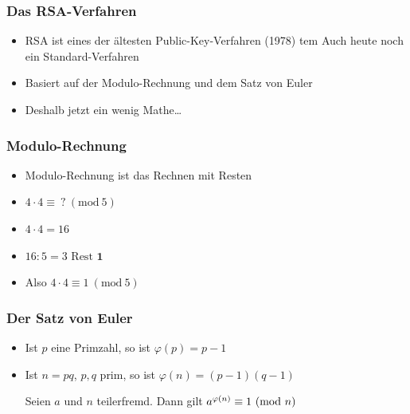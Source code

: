 \documentclass{beamer}
\begin{document}
\begin{frame}
\frametitle{Das RSA-Verfahren}

	\begin{itemize}
		\item RSA ist eines der ältesten Public-Key-Verfahren (1978)
		tem Auch heute noch ein Standard-Verfahren
		\item Basiert auf der Modulo-Rechnung und dem Satz von Euler
		\item Deshalb jetzt ein wenig Mathe\dots
	\end{itemize}
\end{frame}

\begin{frame}
\frametitle{Modulo-Rechnung}
	\begin{itemize}
		\item Modulo-Rechnung ist das Rechnen mit Resten
		\item \(4 \cdot 4 \equiv \ ?\ (\text{mod}\ 5) \)
\pause		\item \(4 \cdot 4 = 16\)
\pause		\item \(16 : 5 = 3 \text{ Rest } \textbf{1}\)
\pause		\item Also \(4 \cdot 4 \equiv 1\ (\text{mod}\ 5) \)
	\end{itemize}
\end{frame}


\begin{frame}
\frametitle{Der Satz von Euler}

\begin{itemize}
	\begin{definition}
		\(\varphi(n) = \) Anzahl der zu \(n\) teilerfremden Zahlen \(\leq n\)
	\end{definition}
\pause	\item Ist \(p\) eine Primzahl, so ist \(\varphi(p) = p-1\)
	\item Ist \(n=pq\), \(p,q\) prim, so ist \(\varphi(n) = (p-1)(q-1)\)

\pause	\begin{theorem}
		Seien \(a\) und \(n\) teilerfremd.
		Dann gilt \(a^{\varphi(n)} \equiv 1 \ (\textnormal{mod}\ n)\)
	\end{theorem}
\end{itemize}
\end{frame}
\end{document}
